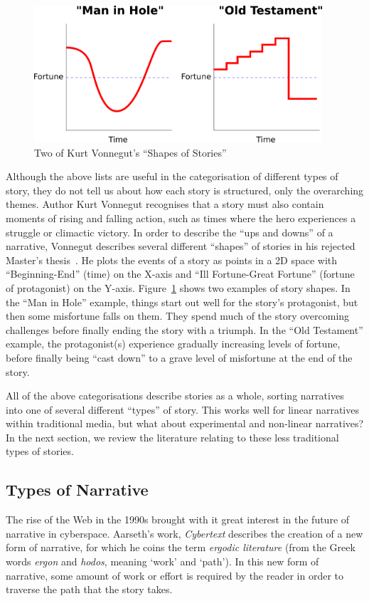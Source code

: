 \documentclass[11pt]{report}
\begin{document}
\begin{figure}[!t]
\centerline{\includegraphics[height=2in]{vonnegut.png}}
\caption{Two of Kurt Vonnegut's ``Shapes of Stories''}\label{fig:vonnegut}
\end{figure}

Although the above lists are useful in the categorisation of different types of
story, they do not tell us about how each story is structured, only the
overarching themes. Author Kurt Vonnegut recognises that a story must also contain
moments of rising and falling action, such as times where the hero experiences a
struggle or climactic victory. In order to describe the ``ups and downs'' of a narrative, Vonnegut describes several different ``shapes'' of stories in his
rejected Master's thesis~\citep{vonnegut2009palm}. He plots the events of a story
as points in a 2D space with ``Beginning-End'' (time) on the X-axis and ``Ill
Fortune-Great Fortune'' (fortune of protagonist) on the Y-axis.
Figure~\ref{fig:vonnegut} shows two examples of story shapes. In the ``Man in
Hole'' example, things start out well for the story's protagonist, but then some
misfortune falls on them. They spend much of the story overcoming challenges
before finally ending the story with a triumph. In the ``Old Testament''
example, the protagonist(s) experience gradually increasing levels of fortune,
before finally being ``cast down'' to a grave level of misfortune at the end of
the story.

All of the above categorisations describe stories as a whole, sorting narratives
into one of several different ``types'' of story. This works well for
linear narratives within traditional media, but what about experimental and
non-linear narratives? In the next section, we review the literature relating to
these less traditional types of stories.

\subsection{Types of Narrative}
\label{sec:narrative-types}
The rise of the Web in the 1990s brought with it great interest in the future of narrative in cyberspace. Aarseth's work, \emph{Cybertext} \citep{aarseth1997cybertext} describes the creation of a new form of narrative, for which he coins the term \emph{ergodic literature} (from the Greek words \emph{ergon} and \emph{hodos}, meaning `work' and `path'). In this new form of narrative, some amount of work or effort is required by the reader in order to traverse the path that the story takes.
\end{document}
